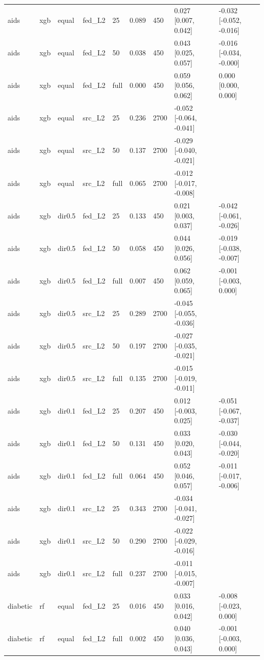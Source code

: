 \begin{tabular}{lllllllll}
aids & xgb & equal & fed\_L2 & 25 & 0.089 & 450 & 0.027 [0.007, 0.042] & -0.032 [-0.052, -0.016] \\
aids & xgb & equal & fed\_L2 & 50 & 0.038 & 450 & 0.043 [0.025, 0.057] & -0.016 [-0.034, -0.000] \\
aids & xgb & equal & fed\_L2 & full & 0.000 & 450 & 0.059 [0.056, 0.062] & 0.000 [0.000, 0.000] \\
aids & xgb & equal & src\_L2 & 25 & 0.236 & 2700 & -0.052 [-0.064, -0.041] &  \\
aids & xgb & equal & src\_L2 & 50 & 0.137 & 2700 & -0.029 [-0.040, -0.021] &  \\
aids & xgb & equal & src\_L2 & full & 0.065 & 2700 & -0.012 [-0.017, -0.008] &  \\
aids & xgb & dir0.5 & fed\_L2 & 25 & 0.133 & 450 & 0.021 [0.003, 0.037] & -0.042 [-0.061, -0.026] \\
aids & xgb & dir0.5 & fed\_L2 & 50 & 0.058 & 450 & 0.044 [0.026, 0.056] & -0.019 [-0.038, -0.007] \\
aids & xgb & dir0.5 & fed\_L2 & full & 0.007 & 450 & 0.062 [0.059, 0.065] & -0.001 [-0.003, 0.000] \\
aids & xgb & dir0.5 & src\_L2 & 25 & 0.289 & 2700 & -0.045 [-0.055, -0.036] &  \\
aids & xgb & dir0.5 & src\_L2 & 50 & 0.197 & 2700 & -0.027 [-0.035, -0.021] &  \\
aids & xgb & dir0.5 & src\_L2 & full & 0.135 & 2700 & -0.015 [-0.019, -0.011] &  \\
aids & xgb & dir0.1 & fed\_L2 & 25 & 0.207 & 450 & 0.012 [-0.003, 0.025] & -0.051 [-0.067, -0.037] \\
aids & xgb & dir0.1 & fed\_L2 & 50 & 0.131 & 450 & 0.033 [0.020, 0.043] & -0.030 [-0.044, -0.020] \\
aids & xgb & dir0.1 & fed\_L2 & full & 0.064 & 450 & 0.052 [0.046, 0.057] & -0.011 [-0.017, -0.006] \\
aids & xgb & dir0.1 & src\_L2 & 25 & 0.343 & 2700 & -0.034 [-0.041, -0.027] &  \\
aids & xgb & dir0.1 & src\_L2 & 50 & 0.290 & 2700 & -0.022 [-0.029, -0.016] &  \\
aids & xgb & dir0.1 & src\_L2 & full & 0.237 & 2700 & -0.011 [-0.015, -0.007] &  \\
\addlinespace
diabetic & rf & equal & fed\_L2 & 25 & 0.016 & 450 & 0.033 [0.016, 0.042] & -0.008 [-0.023, 0.000] \\
diabetic & rf & equal & fed\_L2 & full & 0.002 & 450 & 0.040 [0.036, 0.043] & -0.001 [-0.003, 0.000] \\

\end{tabular}
